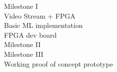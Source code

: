 \thispagestyle{empty}

Milestone I \\
Video Stream + FPGA\\
Basic ML implementation\\
FPGA dev board \\

Milestone II \\

Milestone III \\
Working proof of concept prototype